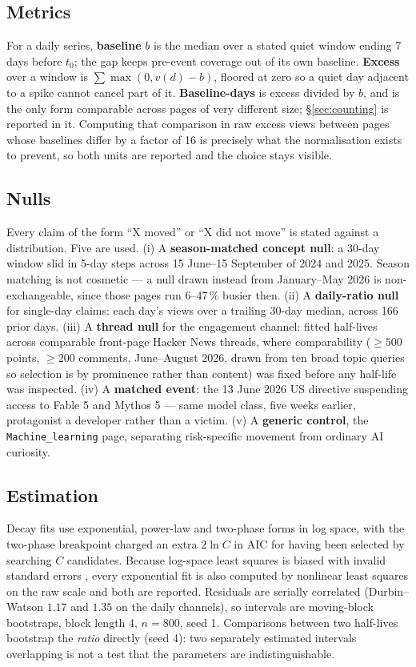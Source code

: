 \documentclass[11pt,a4paper]{article}
\begin{document}
\subsection{Metrics}

For a daily series, \textbf{baseline} $b$ is the median over a stated quiet
window ending 7 days before $t_0$; the gap keeps pre-event coverage out of its
own baseline. \textbf{Excess} over a window is $\sum \max(0, v(d) - b)$, floored
at zero so a quiet day adjacent to a spike cannot cancel part of it.
\textbf{Baseline-days} is excess divided by $b$, and is the only form comparable
across pages of very different size; §\ref{sec:counting} is reported in it.
Computing that comparison in raw excess views between pages whose baselines
differ by a factor of 16 is precisely what the normalisation exists to prevent,
so both units are reported and the choice stays visible.

\subsection{Nulls}

Every claim of the form ``X moved'' or ``X did not move'' is stated against a
distribution. Five are used. (i) A \textbf{season-matched concept null}: a
30-day window slid in 5-day steps across 15 June--15 September of 2024 and 2025.
Season matching is not cosmetic --- a null drawn instead from January--May 2026
is non-exchangeable, since those pages run 6--47\,\% busier then. (ii) A
\textbf{daily-ratio null} for single-day claims: each day's views over a
trailing 30-day median, across 166 prior days. (iii) A \textbf{thread null} for
the engagement channel: fitted half-lives across comparable front-page Hacker
News threads, where comparability ($\geq 500$ points, $\geq 200$ comments,
June--August 2026, drawn from ten broad topic queries so selection is by
prominence rather than content) was fixed before any half-life was inspected.
(iv) A \textbf{matched event}: the 13 June 2026 US directive suspending access
to Fable 5 and Mythos 5 --- same model class, five weeks earlier, protagonist a
developer rather than a victim. (v) A \textbf{generic control}, the
\texttt{Machine\_learning} page, separating risk-specific movement from ordinary
AI curiosity.

\subsection{Estimation}

Decay fits use exponential, power-law and two-phase forms in log space, with the
two-phase breakpoint charged an extra $2\ln C$ in AIC for having been selected
by searching $C$ candidates. Because log-space least squares is biased with
invalid standard errors \cite{clauset2009powerlaw}, every exponential fit is also
computed by nonlinear least squares on the raw scale and both are reported.
Residuals are serially correlated (Durbin--Watson $1.17$ and $1.35$ on the daily
channels), so intervals are moving-block bootstraps, block length 4, $n=800$,
seed 1. Comparisons between two half-lives bootstrap the \emph{ratio} directly
(seed 4): two separately estimated intervals overlapping is not a test that the
parameters are indistinguishable.
\end{document}
